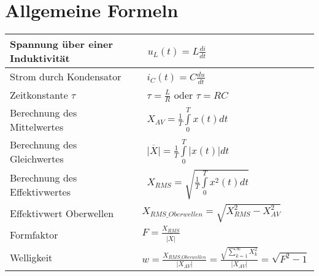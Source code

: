 \section{Allgemeine Formeln}

\begin{tabu}{|l|l|}
	\hline
  Spannung über einer Induktivität
  	&\ $u_{L}(t) = L\frac{di}{dt}$\\
	\hline
  Strom durch Kondensator 
  	&\ $i_{C}(t) = C\frac{du}{dt}$\\
  	\hline
  Zeitkonstante $\tau$
  	&\ $\tau = \frac{L}{R}$ oder $\tau = RC$\\
  	\hline
  Berechnung des Mittelwertes
  	&\ $X_{AV} = \frac{1}{T}\int\limits_{0}^{T}x(t)dt$\\
  	\hline
  Berechnung des Gleichwertes
  	&\ $\overline{|X|} = \frac{1}{T} \int\limits_{0}^{T} |x(t)|dt$\\
  	\hline
  Berechnung des Effektivwertes
  	&\ $X_{RMS} = \sqrt{\frac{1}{T}\int\limits_{0}^{T}x^2(t)dt}$\\
  	\hline
  Effektivwert Oberwellen
    & $X_{RMS\_Oberwellen} = \sqrt{X_{RMS}^2 - X_{AV}^2}$\\
  \hline
  Formfaktor
    & $F = \frac{X_{RMS}}{\overline{|X|}}$\\
  \hline
  Welligkeit
  	& $w = \frac{X_{RMS\_Oberwellen}}{|X_{AV}|}= \frac{\sqrt{\sum\limits_{k = 1}^{\infty}X_{k}^2}}{|X_{AV}|} = \sqrt{F^2-1}$\\
  \hline
\end{tabu}